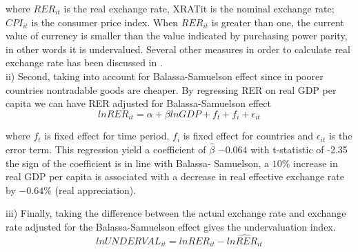 \documentclass{article}
\begin{document}
where $RER_{it}$ is the real exchange rate, XRATit is the nominal exchange rate; $CPI_{it}$ is the consumer price index. When $RER_{it}$ is greater than one, the current value of currency is smaller than the value indicated by purchasing power parity, in other words it is undervalued. Several other measures in order to calculate real exchange rate has been discussed in \cite{chib1995marginal}. \\
ii) Second, taking into account for Balassa-Samuelson effect since in poorer countries nontradable goods are cheaper. By regressing RER on real GDP per capita we can have RER adjusted for Balassa-Samuelson effect
\begin{equation}
lnRER_{it} =\alpha+\beta ln GDP +f_t +f_i +\epsilon_{it}
\end{equation}

where $f_t$ is fixed effect for time period, $f_i$ is fixed effect for countries and $\epsilon_{it}$ is the error term. This regression yield a coefficient of $\hat{\beta}$ $-0.064$  with t-statistic of -2.35 the sign of the coefficient is in line with Balassa- Samuelson, a $10 \%$ increase in real GDP per capita is associated with a decrease in real effective exchange rate by $-0.64 \%$ (real appreciation).

iii) Finally, taking the difference between the actual exchange rate and exchange rate adjusted for the Balassa-Samuelson effect gives the undervaluation index.\\
\begin{equation}
lnUNDERVAL_{it}=lnRER_{it}-\hat{lnRER_{it}}
\end{equation}
\end{document}
